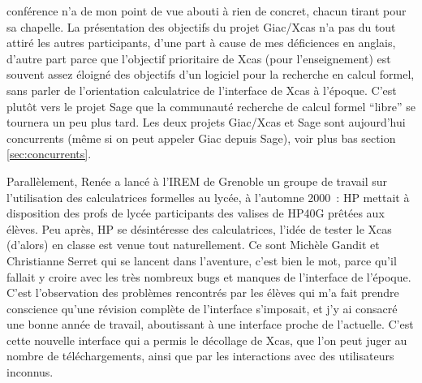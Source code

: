 \documentclass[a4paper,11pt]{article}
\begin{document}
\begin{giacjshere}
conf\'erence n'a de mon point de vue abouti \`a rien de concret,
chacun tirant pour sa chapelle. La pr\'esentation des objectifs du projet 
Giac/Xcas n'a pas du tout attir\'e les autres participants,
d'une part \`a cause de mes d\'eficiences en anglais,
d'autre part parce que l'objectif prioritaire de Xcas (pour l'enseignement)
est souvent assez \'eloign\'e des objectifs d'un logiciel
pour la recherche en calcul formel, sans parler de l'orientation
calculatrice de l'interface de Xcas \`a l'\'epoque.
C'est plut\^ot vers le projet Sage que la
communaut\'e recherche de calcul formel ``libre'' se tournera un peu
plus tard. Les deux projets Giac/Xcas et Sage sont
aujourd'hui concurrents (m\^eme si on peut appeler Giac
depuis Sage), voir plus bas section \ref{sec:concurrents}.

Parall\`element, Ren\'ee a lanc\'e \`a l'IREM de Grenoble
un groupe de travail sur l'utilisation des calculatrices
formelles au lyc\'ee, \`a l'automne 2000~:
HP mettait \`a disposition
des profs de lyc\'ee participants des valises de HP40G
pr\^et\'ees aux \'el\`eves. Peu apr\`es, HP se d\'esint\'eresse
des calculatrices, l'id\'ee de tester le Xcas (d'alors) en classe
est venue tout naturellement. Ce sont Mich\`ele Gandit et
Christianne Serret qui se lancent dans l'aventure, c'est bien
le mot, parce qu'il fallait y croire avec les tr\`es nombreux
bugs et manques de l'interface de l'\'epoque. C'est
l'observation des probl\`emes rencontr\'es par les \'el\`eves
qui m'a fait prendre conscience qu'une r\'evision compl\`ete
de l'interface s'imposait, et j'y ai consacr\'e une bonne ann\'ee
de travail, aboutissant \`a une interface proche de l'actuelle.
C'est cette nouvelle interface qui a permis le
d\'ecollage de Xcas, que l'on peut juger
au nombre de t\'el\'echargements, ainsi que par
les interactions avec des utilisateurs inconnus.


\end{giacjshere}
\end{document}
